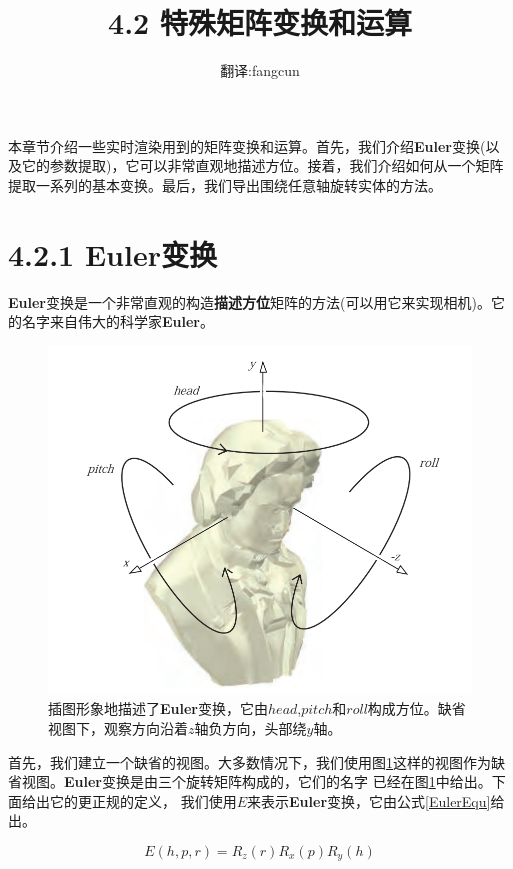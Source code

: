 \documentclass{ctexart}
\title{4.2 特殊矩阵变换和运算}
\author{翻译:fangcun}
\begin{document}
\maketitle
\newpage
\tableofcontents
\newpage
本章节介绍一些实时渲染用到的矩阵变换和运算。首先，我们介绍\textbf{Euler}变换(以及它的参数提取)，它可以非常直观地描述方位。接着，我们介绍如何从一个矩阵
提取一系列的基本变换。最后，我们导出围绕任意轴旋转实体的方法。

\section{4.2.1 Euler变换}
\textbf{Euler}变换是一个非常直观的构造\textbf{描述方位}矩阵的方法(可以用它来实现相机)。它的名字来自伟大的科学家\textbf{Euler}。

\begin{figure}
	\centering
	\includegraphics[scale=0.8]{4-6.png}
	\caption{插图形象地描述了\textbf{Euler}变换，它由$head$,$pitch$和$roll$构成方位。缺省视图下，观察方向沿着$z$轴负方向，头部绕$y$轴。}
	\label{EulerFigure}
\end{figure}

首先，我们建立一个缺省的视图。大多数情况下，我们使用图\ref{EulerFigure}这样的视图作为缺省视图。\textbf{Euler}变换是由三个旋转矩阵构成的，它们的名字
已经在图\ref{EulerFigure}中给出。下面给出它的更正规的定义，
我们使用$E$来表示\textbf{Euler}变换，它由公式\ref{EulerEqu}给出。

\begin{equation}
	\label{EulerEqu}
	E(h,p,r)=R_{z}(r)R_{x}(p)R_{y}(h)
\end{equation}
\end{document}
